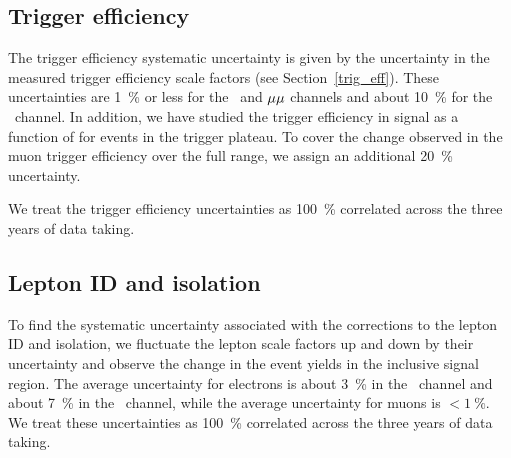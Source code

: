 \subsection{Trigger efficiency}
The trigger efficiency systematic uncertainty is given by the uncertainty in the measured trigger efficiency scale factors (see Section~\ref{trig_eff}). These uncertainties are \SI{1}{\percent} or less for the \Pe\Pgm\ and ${\mu}{\mu}$ channels and about \SI{10}{\percent} for the \Pe\Pe\ channel. In addition, we have studied the trigger efficiency in signal as a function of \ad{} for events in the trigger \pt plateau. To cover the change observed in the muon trigger efficiency over the full \ad range, we assign an additional \SI{20}{\percent} uncertainty.

We treat the trigger efficiency uncertainties as \SI{100}{\percent} correlated across the three years of data taking.

%

\subsection{Lepton ID and isolation}
To find the systematic uncertainty associated with the corrections to the lepton ID and isolation, we fluctuate the lepton scale factors up and down by their uncertainty and observe the change in the event yields in the inclusive signal region. The average uncertainty for electrons is about \SI{3}{\percent} in the \Pe\Pgm\ channel and about \SI{7}{\percent} in the \Pe\Pe\ channel, while the average uncertainty for muons is $< \SI{1}{\percent}$. We treat these uncertainties as \SI{100}{\percent} correlated across the three years of data taking.

